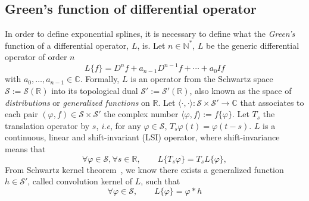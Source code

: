 \subsection{Green's function of differential operator}
In order to define exponential splines, it is necessary to define what the \emph{Green's} function of a differential 
operator, $L$, is. Let $n \in \mathbb{N}^*$, $L$ be the generic differential operator of order $n$ \begin{equation*}
  L\{f\} = D^n{f} + a_{n-1}D^{n-1}{f} + \cdots + a_0 I{f}
\end{equation*}
with $a_0, \ldots, a_{n-1} \in \mathbb{C}$. Formally, $L$ is an operator from the Schwartz space $\mathcal{S} := 
\mathcal{S}(\mathbb{R})$ into its topological dual $\mathcal{S}' := \mathcal{S}'(\mathbb{R})$, also known as the space 
of \emph{distributions} or \emph{generalized functions} on $\mathbb{R}$. Let $\langle\cdot,\cdot\rangle: 
\mathcal{S}\times\mathcal{S}' \to \mathbb{C}$ that associates to each pair $(\varphi, f) \in 
\mathcal{S}\times\mathcal{S}'$ the complex number $\langle \varphi, f \rangle := f\{\varphi\}$. Let $T_s$ the 
translation operator by $s$, \textit{i.e}, for any $\varphi \in \mathcal{S}$, $T_s\varphi(t) = \varphi(t-s)$. $L$ is a 
continuous, linear and shift-invariant (LSI) operator, where shift-invariance means that
\begin{equation*}
  \forall \varphi \in \mathcal{S}, \forall s \in \mathbb{R}, \qquad L\{T_s\varphi\} = T_sL\{\varphi\},
\end{equation*}
From Schwartz kernel theorem~\cite[Corollary 3.3]{unser_introduction_2014}, we know there exists a generalized function 
$h \in \mathcal{S}'$, called convolution kernel of $L$, such that
\begin{equation*}
  \forall \varphi \in \mathcal{S}, \qquad L\{\varphi\} = \varphi * h
\end{equation*}

